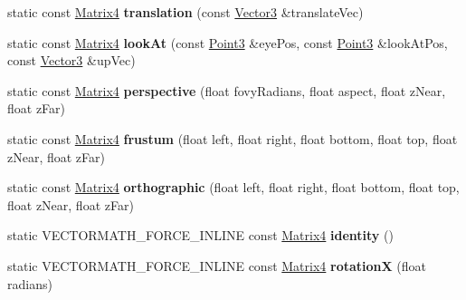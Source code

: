 \begin{DoxyCompactItemize}
\mbox{\label{classVectormath_1_1Aos_1_1Matrix4_a370167ca611b89b808727a9adeb32815}} 
static const \hyperlink{classVectormath_1_1Aos_1_1Matrix4}{Matrix4} {\bfseries translation} (const \hyperlink{classVectormath_1_1Aos_1_1Vector3}{Vector3} \&translate\+Vec)
\item 
\mbox{\label{classVectormath_1_1Aos_1_1Matrix4_a689156ee3be7487fdd316d6524774947}} 
static const \hyperlink{classVectormath_1_1Aos_1_1Matrix4}{Matrix4} {\bfseries look\+At} (const \hyperlink{classVectormath_1_1Aos_1_1Point3}{Point3} \&eye\+Pos, const \hyperlink{classVectormath_1_1Aos_1_1Point3}{Point3} \&look\+At\+Pos, const \hyperlink{classVectormath_1_1Aos_1_1Vector3}{Vector3} \&up\+Vec)
\item 
\mbox{\label{classVectormath_1_1Aos_1_1Matrix4_a5c56753075ff7fc280c7534f0f7f3310}} 
static const \hyperlink{classVectormath_1_1Aos_1_1Matrix4}{Matrix4} {\bfseries perspective} (float fovy\+Radians, float aspect, float z\+Near, float z\+Far)
\item 
\mbox{\label{classVectormath_1_1Aos_1_1Matrix4_ad1b95c29754cf39128f5c90779a53d2e}} 
static const \hyperlink{classVectormath_1_1Aos_1_1Matrix4}{Matrix4} {\bfseries frustum} (float left, float right, float bottom, float top, float z\+Near, float z\+Far)
\item 
\mbox{\label{classVectormath_1_1Aos_1_1Matrix4_af2bb0513df5fa3be77b5cef316c94249}} 
static const \hyperlink{classVectormath_1_1Aos_1_1Matrix4}{Matrix4} {\bfseries orthographic} (float left, float right, float bottom, float top, float z\+Near, float z\+Far)
\item 
\mbox{\label{classVectormath_1_1Aos_1_1Matrix4_a5e0e7343c349add9fdc3c392445a237a}} 
static V\+E\+C\+T\+O\+R\+M\+A\+T\+H\+\_\+\+F\+O\+R\+C\+E\+\_\+\+I\+N\+L\+I\+NE const \hyperlink{classVectormath_1_1Aos_1_1Matrix4}{Matrix4} {\bfseries identity} ()
\item 
\mbox{\label{classVectormath_1_1Aos_1_1Matrix4_a0f8e8cdfe45e0832b36e20b676124b5c}} 
static V\+E\+C\+T\+O\+R\+M\+A\+T\+H\+\_\+\+F\+O\+R\+C\+E\+\_\+\+I\+N\+L\+I\+NE const \hyperlink{classVectormath_1_1Aos_1_1Matrix4}{Matrix4} {\bfseries rotationX} (float radians)

\end{DoxyCompactItemize}
